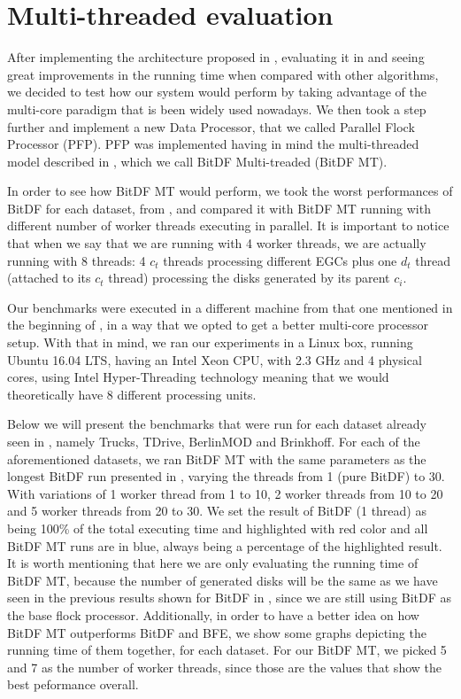 {%
\section{Multi-threaded evaluation}
After implementing the architecture proposed in , evaluating it in  and
seeing great improvements in the running time when compared with other algorithms, we decided to test how our system
would perform by taking advantage of the multi-core paradigm that is been widely used nowadays. We then took a step
further and implement a new Data Processor, that we called Parallel Flock Processor (PFP). PFP was implemented having in
mind the multi-threaded model described in , which we call BitDF Multi-treaded (BitDF MT).

In order to see how BitDF MT would perform, we took the worst performances of BitDF for each dataset, from
, and compared it with BitDF MT running with different number of worker threads executing in
parallel. It is important to notice that when we say that we are running with 4 worker threads, we are actually running
with 8 threads: 4 $c_t$ threads processing different EGCs plus one $d_t$ thread (attached to its $c_t$ thread)
processing the disks generated by its parent $c_i$.

Our benchmarks were executed in a different machine from that one mentioned in the beginning of ,
in a way that we opted to get a better multi-core processor setup. With that in mind, we ran our experiments in a Linux
box, running Ubuntu 16.04 LTS, having an Intel Xeon CPU, with 2.3 GHz and 4 physical cores, using Intel Hyper-Threading
technology \citep{hyper} meaning that we would theoretically have 8 different processing units.

Below we will present the benchmarks that were run for each dataset already seen in , namely
Trucks, TDrive, BerlinMOD and Brinkhoff. For each of the aforementioned datasets, we ran BitDF MT with the same
parameters as the longest BitDF run presented in , varying the threads from 1 (pure BitDF) to 30.
With variations of 1 worker thread from 1 to 10, 2 worker threads from 10 to 20 and 5 worker threads from 20 to 30. We
set the result of BitDF (1 thread) as being 100\% of the total executing time and highlighted with red color and all
BitDF MT runs are in blue, always being a percentage of the highlighted result. It is worth mentioning that here we are
only evaluating the running time of BitDF MT, because the number of generated disks will be the same as we have seen in
the previous results shown for BitDF in , since we are still using BitDF as the base flock
processor. Additionally, in order to have a better idea on how BitDF MT outperforms BitDF and BFE, we show some graphs
depicting the running time of them together, for each dataset. For our BitDF MT, we picked 5 and 7 as the number of
worker threads, since those are the values that show the best peformance overall.

}
